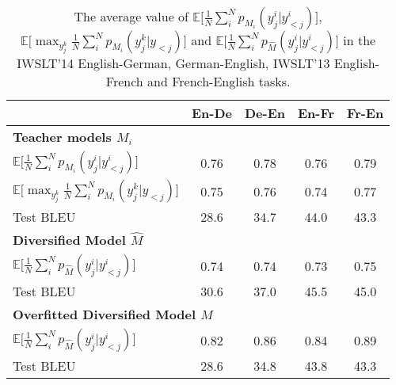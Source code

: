 \documentclass{article}
\newcommand{\E}{\mathbb{E}}
\begin{document}
\begin{table}[t]
\begin{center}
\caption{The average value of $\E \Big[\frac{1}{N}\sum_i^N p_{M_i}(y^i_j|y_{<j}^i) \Big]$, $\E \Big[\max_{y_j^k}\frac{1}{N}\sum_i^N p_{M_i}(y^k_j|y_{<j}) \Big]$ and $\E \Big[\frac{1}{N}\sum_i^N p_{\hat{M}}(y^i_j|y_{<j}^i)\Big]$ in the IWSLT'14 English-German, German-English, IWSLT'13 English-French and French-English tasks.}
\begin{tabular}{lcccc}
\toprule
& {\bf En-De} & {\bf De-En} & {\bf En-Fr} & {\bf Fr-En}\\
\midrule
\multicolumn{5}{l}{\bf Teacher models $M_i$}\\
$\E \Big[\frac{1}{N}\sum_i^N p_{M_i}(y^i_j|y_{<j}^i) \Big]$             & 0.76  & 0.78   & 0.76    & 0.79\\
$\E \Big[\max_{y_j^k}\frac{1}{N}\sum_i^N p_{M_i}(y^k_j|y_{<j}) \Big]$   & 0.75  & 0.76   & 0.74    & 0.77\\
Test BLEU                                       & 28.6  & 34.7   & 44.0    & 43.3\\
\midrule
\multicolumn{5}{l}{\bf Diversified Model $\hat{M}$}\\
$\E \Big[\frac{1}{N}\sum_i^N p_{\hat{M}}(y^i_j|y_{<j}^i) \Big]$     & 0.74  & 0.74    & 0.73    & 0.75     \\
Test BLEU                                       & 30.6  & 37.0    & 45.5    & 45.0    \\
\midrule
\multicolumn{5}{l}{\bf Overfitted Diversified Model $\hat{M}$}\\
$\E \Big[\frac{1}{N}\sum_i^N p_{\hat{M}}(y^i_j|y_{<j}^i)\Big]$     & 0.82  & 0.86    & 0.84    & 0.89     \\
Test BLEU                                       & 28.6  & 34.8    & 43.8    & 43.3 \\
\bottomrule
\end{tabular}
\label{table:avg_en_prob_cond}
\end{center}
\end{table}
\end{document}

